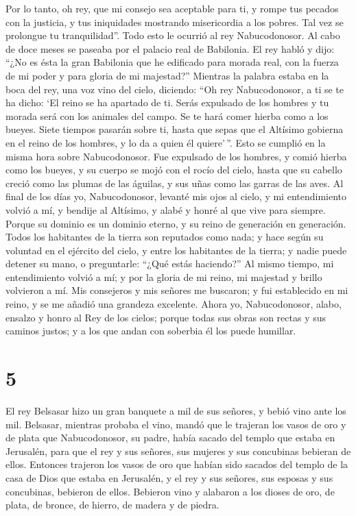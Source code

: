  Por lo tanto, oh rey, que mi consejo sea aceptable para
ti, y rompe tus pecados con la justicia, y tus iniquidades mostrando
misericordia a los pobres. Tal vez se prolongue tu tranquilidad''.
 Todo esto le ocurrió al rey Nabucodonosor.
 Al cabo de doce meses se paseaba por el palacio real de
Babilonia.  El rey habló y dijo: ``¿No es ésta la gran
Babilonia que he edificado para morada real, con la fuerza de mi poder y
para gloria de mi majestad?''  Mientras la palabra estaba
en la boca del rey, una voz vino del cielo, diciendo: ``Oh rey
Nabucodonosor, a ti se te ha dicho: `El reino se ha apartado de ti.
 Serás expulsado de los hombres y tu morada será con los
animales del campo. Se te hará comer hierba como a los bueyes. Siete
tiempos pasarán sobre ti, hasta que sepas que el Altísimo gobierna en el
reino de los hombres, y lo da a quien él quiere'\,''. 
Esto se cumplió en la misma hora sobre Nabucodonosor. Fue expulsado de
los hombres, y comió hierba como los bueyes, y su cuerpo se mojó con el
rocío del cielo, hasta que su cabello creció como las plumas de las
águilas, y sus uñas como las garras de las aves.  Al
final de los días yo, Nabucodonosor, levanté mis ojos al cielo, y mi
entendimiento volvió a mí, y bendije al Altísimo, y alabé y honré al que
vive para siempre. Porque su dominio es un dominio eterno, y su reino de
generación en generación.  Todos los habitantes de la
tierra son reputados como nada; y hace según su voluntad en el ejército
del cielo, y entre los habitantes de la tierra; y nadie puede detener su
mano, o preguntarle: ``¿Qué estás haciendo?''  Al mismo
tiempo, mi entendimiento volvió a mí; y por la gloria de mi reino, mi
majestad y brillo volvieron a mí. Mis consejeros y mis señores me
buscaron; y fui establecido en mi reino, y se me añadió una grandeza
excelente.  Ahora yo, Nabucodonosor, alabo, ensalzo y
honro al Rey de los cielos; porque todas sus obras son rectas y sus
caminos justos; y a los que andan con soberbia él los puede humillar.

\hypertarget{section-4}{%
\section{5}\label{section-4}}

 El rey Belsasar hizo un gran banquete a mil de sus
señores, y bebió vino ante los mil.  Belsasar, mientras
probaba el vino, mandó que le trajeran los vasos de oro y de plata que
Nabucodonosor, su padre, había sacado del templo que estaba en
Jerusalén, para que el rey y sus señores, sus mujeres y sus concubinas
bebieran de ellos.  Entonces trajeron los vasos de oro que
habían sido sacados del templo de la casa de Dios que estaba en
Jerusalén, y el rey y sus señores, sus esposas y sus concubinas,
bebieron de ellos.  Bebieron vino y alabaron a los dioses
de oro, de plata, de bronce, de hierro, de madera y de piedra.

